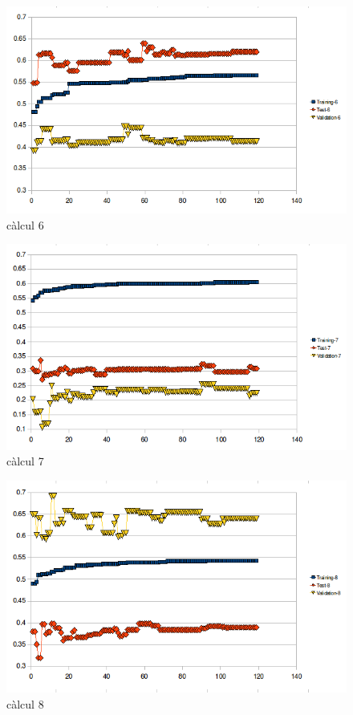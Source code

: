 \documentclass[titlepage,a4paper,12pt]{book}
\begin{document}
\begin{figure}[h]
\begin{center}
\includegraphics[scale=0.75]{pholus/pholus6.png}
\end{center}
\caption{càlcul 6}
\label{fig:pholusResult6}
\end{figure}

\begin{figure}[h]
\begin{center}
\includegraphics[scale=0.75]{pholus/pholus7.png}
\end{center}
\caption{càlcul 7}
\label{fig:pholusResult7}
\end{figure}

\begin{figure}[h]
\begin{center}
\includegraphics[scale=0.75]{pholus/pholus8.png}
\end{center}
\caption{càlcul 8}
\label{fig:pholusResult8}
\end{figure}
\end{document}
